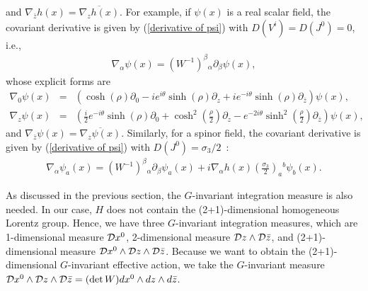 \documentclass[a4paper,12pt]{article}
\begin{document}
and $\nabla_{\bar{z}}h(x) = \overline{\nabla_{z}h(x)}$. 
For example, if $\psi(x)$ is a real scalar field, the covariant derivative 
is given by (\ref{derivative of psi}) with $D(V^{i})=D(J^{0})=0$, i.e.,
\begin{eqnarray}
\nabla_{\alpha} \psi(x) = \left( W^{-1} \right)^{\beta}{}_{\alpha}
\partial_{\beta} \psi(x),
\end{eqnarray}
whose explicit forms are
\begin{eqnarray}
\nabla_{0}\psi(x) &=& \left( \cosh(\rho) \partial_{0} -i e^{i \theta}
\sinh(\rho) \partial_{z} + ie^{-i \theta} \sinh(\rho)
\partial_{\bar{z}} \right) \psi(x), \\
\nabla_{z}\psi(x) &=& \left( \frac{i}{2} e^{-i \theta} \sinh(\rho) 
\partial_{0} + \cosh^{2} (\frac{\rho}{2} ) \partial_{z} 
- e^{-2 i \theta} \sinh^{2} (\frac{\rho}{2} ) \partial_{\bar{z}}
\right) \psi(x),
\end{eqnarray}
and $\nabla_{\bar{z}} \psi(x) = \overline{\nabla_{z}\psi(x)}$. 
Similarly, for a spinor field, the covariant derivative is
given by (\ref{derivative of psi}) with $D(J^{0})= \sigma_{3}/2$~:
\begin{eqnarray}
\nabla_{\alpha} \psi_{a}(x) = \left( W^{-1} \right)^{\beta}{}_{\alpha}
\partial_{\beta} \psi_{a}(x) + i \nabla_{\alpha} h(x) 
\left(\frac{\sigma_{3}}{2}\right)_{a}{}^{b} \psi_{b}(x).
\end{eqnarray}

As discussed in the previous section, the $G$-invariant integration
measure is also needed. In our case, $H$ does not
contain the (2+1)-dimensional homogeneous Lorentz group.
Hence, we have three $G$-invariant integration measures, which are
1-dimensional measure ${\cal D} x^{0}$, 2-dimensional measure
${\cal D} z \wedge {\cal D} \bar{z}$, and (2+1)-dimensional measure
${\cal D} x^{0} \wedge {\cal D} z \wedge {\cal D} \bar{z}$.
Because we want to obtain the (2+1)-dimensional $G$-invariant
effective action, we take the $G$-invariant measure 
${\cal D} x^{0} \wedge {\cal D} z \wedge {\cal D} \bar{z} =
(\det W)dx^{0} \wedge dz \wedge d\bar{z}$. 
\end{document}
